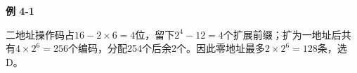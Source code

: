 {\color{ink}\bfseries 例 4-1}\par\vspace{1bp}二地址操作码占\(16-2\times 6=\allowbreak{}4\)位，留下\(2^{4}-12=\allowbreak{}4\)个扩展前缀；扩为一地址后共有\(4\times 2^{6}=\allowbreak{}256\)个编码，分配254个后余2个。因此零地址最多\(2\times 2^{6}=\allowbreak{}128\)条，选D。
